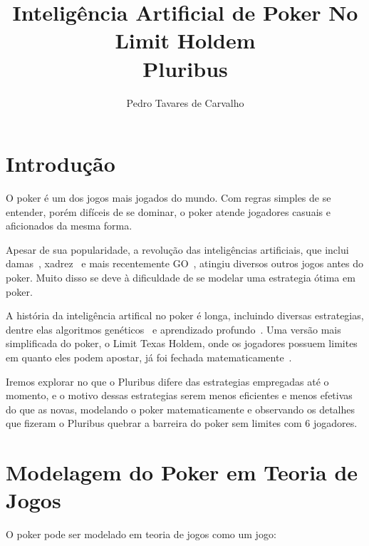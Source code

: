 \documentclass[twocolumn]{article}
\title{Inteligência Artificial de Poker No Limit Holdem\\Pluribus}
\author{Pedro Tavares de Carvalho}
\theoremstyle{mytheoremstyle}
\theoremstyle{mytheoremstyle}
\theoremstyle{myproblemstyle}
\begin{document}
        \maketitle

        \thispagestyle{empty}


    \section{Introdução} %
    \label{sec:Introdução}
        O poker é um dos jogos mais jogados do mundo. Com regras simples de se entender, porém
        difíceis de se dominar, o poker atende jogadores casuais e aficionados da mesma forma.

        Apesar de sua popularidade, a revolução das inteligências artificiais, que inclui damas~\cite{5392560}, xadrez~\cite{CAMPBELL200257}
        e mais recentemente GO~\cite{Silver2016}, atingiu diversos outros jogos antes do poker. Muito disso se deve à
        dificuldade de se modelar uma \gls{estrategia} ótima em poker.

        A história da inteligência artifical no poker é longa, incluindo diversas \glspl{estrategia}, dentre elas algoritmos genéticos~\cite{4219032} e
        aprendizado profundo~\cite{DBLP:journals/corr/MoravcikSBLMBDW17}. Uma versão mais simplificada do poker, o Limit Texas Holdem, onde os jogadores possuem
        limites em quanto eles podem apostar, já foi fechada matematicamente~\cite{bowling2015heads}.

        Iremos explorar no que o Pluribus difere das \glspl{estrategia} empregadas até o momento, e o motivo dessas \glspl{estrategia} serem menos eficientes
        e menos efetivas do que as novas, modelando o poker matematicamente e observando os detalhes que fizeram o Pluribus quebrar a barreira
        do poker sem limites com 6 jogadores.


    \section{Modelagem do Poker em Teoria de Jogos } %
    \label{sec:Modelagem do Poker em Teoria de Jogos }
        O poker pode ser modelado em teoria de jogos como um jogo:
\end{document}
